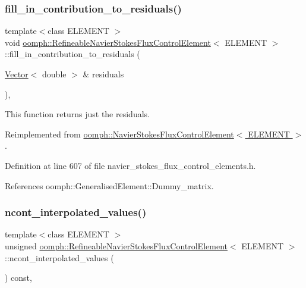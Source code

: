 \subsubsection{\texorpdfstring{fill\+\_\+in\+\_\+contribution\+\_\+to\+\_\+residuals()}{fill\_in\_contribution\_to\_residuals()}}
{\footnotesize\ttfamily template$<$class E\+L\+E\+M\+E\+NT $>$ \\
void \hyperlink{classoomph_1_1RefineableNavierStokesFluxControlElement}{oomph\+::\+Refineable\+Navier\+Stokes\+Flux\+Control\+Element}$<$ E\+L\+E\+M\+E\+NT $>$\+::fill\+\_\+in\+\_\+contribution\+\_\+to\+\_\+residuals (\begin{DoxyParamCaption}\item[{\hyperlink{classoomph_1_1Vector}{Vector}$<$ double $>$ \&}]{residuals }\end{DoxyParamCaption})\hspace{0.3cm}{\ttfamily [inline]}, {\ttfamily [virtual]}}



This function returns just the residuals. 



Reimplemented from \hyperlink{classoomph_1_1NavierStokesFluxControlElement_ad612e8f706ba627f11dd380cc20bfab2}{oomph\+::\+Navier\+Stokes\+Flux\+Control\+Element$<$ E\+L\+E\+M\+E\+N\+T $>$}.



Definition at line 607 of file navier\+\_\+stokes\+\_\+flux\+\_\+control\+\_\+elements.\+h.



References oomph\+::\+Generalised\+Element\+::\+Dummy\+\_\+matrix.

\mbox{\label{classoomph_1_1RefineableNavierStokesFluxControlElement_a047277ea9c38d3d411b3734c59b64435}} 
\subsubsection{\texorpdfstring{ncont\+\_\+interpolated\+\_\+values()}{ncont\_interpolated\_values()}}
{\footnotesize\ttfamily template$<$class E\+L\+E\+M\+E\+NT $>$ \\
unsigned \hyperlink{classoomph_1_1RefineableNavierStokesFluxControlElement}{oomph\+::\+Refineable\+Navier\+Stokes\+Flux\+Control\+Element}$<$ E\+L\+E\+M\+E\+NT $>$\+::ncont\+\_\+interpolated\+\_\+values (\begin{DoxyParamCaption}{ }\end{DoxyParamCaption}) const\hspace{0.3cm}{\ttfamily [inline]}, {\ttfamily [virtual]}}



